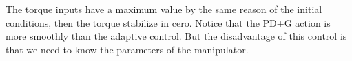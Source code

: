 The torque inputs have a maximum value by the same reason of the initial conditions, then the torque stabilize in cero. Notice that the PD+G action is more smoothly than the adaptive control. But the disadvantage of this control is that we need to know the parameters of the manipulator.\\

\begin{figure}[tb]
\centering
{}
\end{figure}
